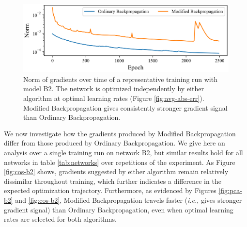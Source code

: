 \documentclass{article}
\theoremstyle{plain}
\theoremstyle{definition}
\theoremstyle{remark}
\begin{document}
\begin{figure}[h]
    \centering
    \includegraphics[width=0.95\columnwidth]{./resources/norm.png}
    \caption{Norm of gradients over time of a representative training run with model B2. The network is optimized independently by either algorithm at optimal learning rates (Figure \ref{fig:avg-abs-err}). Modified Backpropagation gives consistently stronger gradient signal than Ordinary Backpropagation.}
    \label{fig:norm-b2}
\end{figure}

We now investigate how the gradients produced by Modified Backpropagation differ from those produced by Ordinary Backpropagation. We give here an analysis over a single training run on network B2, but similar results hold for all networks in table \ref{tab:networks} over repetitions of the experiment. As Figure \ref{fig:cos-b2} shows, gradients suggested by either algorithm remain relatively dissimilar throughout training, which further indicates a difference in the expected optimization trajectory. Furthermore, as evidenced by Figures \ref{fig:pca-b2} and \ref{fig:cos-b2}, Modified Backpropagation travels faster (\textit{i.e.}, gives stronger gradient signal) than Ordinary Backpropagation, even when optimal learning rates are selected for both algorithms.

\end{document}

